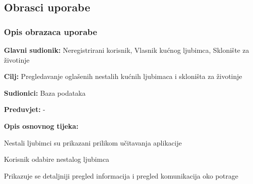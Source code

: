 \eject



\subsection{Obrasci uporabe}

\subsubsection{Opis obrazaca uporabe}

\noindent {}
\begin{packed_item}

	\item \textbf{Glavni sudionik: }Neregistrirani korisnik, Vlasnik kućnog ljubimca, Sklonište za životinje
	\item  \textbf{Cilj:} Pregledavanje oglašenih nestalih kućnih ljubimaca i skloništa za životinje
	\item  \textbf{Sudionici:} Baza podataka
	\item  \textbf{Preduvjet:} -
	\item  \textbf{Opis osnovnog tijeka:}

	\item[] \begin{packed_enum}

		\item Nestali ljubimci su prikazani prilikom učitavanja aplikacije
		\item Korisnik odabire nestalog ljubimca
		\item Prikazuje se detaljniji pregled informacija i pregled komunikacija oko potrage
	\end{packed_enum}

\end{packed_item}

